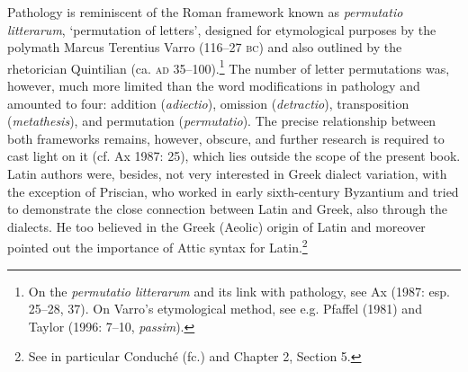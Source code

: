 \documentclass[12pt]{article}
\newenvironment{styleCatalogusnotities}{\renewcommand\baselinestretch{1.25}\setlength\leftskip{0in}\setlength\rightskip{0in}\setlength\parindent{0in}\setlength\parfillskip{0pt plus 1fil}\setlength\parskip{0in plus 1pt}\writerlistparindent\writerlistleftskip\leavevmode\normalfont\normalsize\writerlistlabel\ignorespaces}{\unskip\vspace{0in plus 1pt}\par}
\newcommand\writerlistleftskip{}
\newcommand\writerlistparindent{}
\newcommand\writerlistlabel{}
\begin{document}
\begin{styleCatalogusnotities}
Pathology is reminiscent of the Roman framework known as \textit{permutatio litterarum}, ‘permutation of letters’, designed for etymological purposes by the polymath Marcus Terentius Varro (116–27 \textsc{bc}) and also outlined by the rhetorician Quintilian (ca. \textsc{ad} 35–100).\footnote{\textrm{ On the }\textrm{\textit{permutatio litterarum }}\textrm{and its link with pathology, see Ax (1987: esp. 25–28, 37). On Varro’s etymological method, see e.g. Pfaffel (1981) and Taylor (1996: 7–10, }\textrm{\textit{passim}}\textrm{).}} The number of letter permutations was, however, much more limited than the word modifications in pathology and amounted to four: addition (\textit{adiectio}), omission (\textit{detractio}), transposition (\textit{metathesis}), and permutation (\textit{permutatio}). The precise relationship between both frameworks remains, however, obscure, and further research is required to cast light on it (cf. Ax 1987: 25), which lies outside the scope of the present book. Latin authors were, besides, not very interested in Greek dialect variation, with the exception of Priscian, who worked in early sixth-century Byzantium and tried to demonstrate the close connection between Latin and Greek, also through the dialects. He too believed in the Greek (Aeolic) origin of Latin and moreover pointed out the importance of Attic syntax for Latin.\footnote{\textrm{ See in particular Conduché (fc.) and Chapter 2, Section 5.}}
\end{styleCatalogusnotities}
\end{document}
